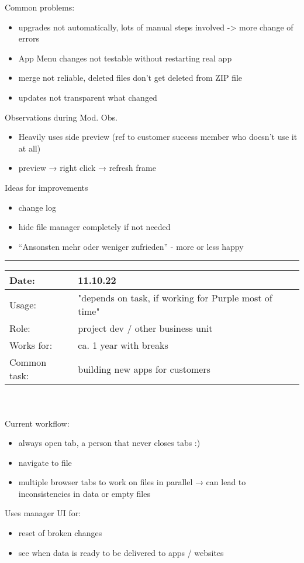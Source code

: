 Common problems:
\begin{itemize}[nosep]  
  \item upgrades not automatically, lots of manual steps involved -> more change of errors
  \item App Menu changes not testable without restarting real app
  \item merge not reliable, deleted files don't get deleted from ZIP file
  \item updates not transparent what changed
\end{itemize}


Observations during Mod. Obs.
\begin{itemize}[nosep]  
  \item Heavily uses side preview (ref to customer success member who doesn't use it at all)
  \item preview → right click → refresh frame
\end{itemize}

Ideas for improvements
\begin{itemize}[nosep]  
  \item change log
  \item hide file manager completely if not needed
  \item “Ansonsten mehr oder weniger zufrieden” - more or less happy
\end{itemize}
\bigskip
\hrule
\begin{tabularx}{\linewidth}{lX}
  Date: & 11.10.22 \\
  \hline
  Usage: & "depends on task, if working for Purple most of time"\\
  \hline
  Role: & project dev / other business unit \\
  \hline
  Works for: & ca. 1 year with breaks \\
  \hline
  Common task: &  building new apps for customers
\end{tabularx}
\\\\
Current workflow:
\begin{itemize}[nosep]
  \item always open tab, a person that never closes tabs :)
  \item navigate to file
  \item multiple browser tabs to work on files in parallel → can lead to inconsistencies in data or empty files
\end{itemize}
Uses manager UI for:
\begin{itemize}[nosep]
  \item reset of broken changes
  \item see when data is ready to be delivered to apps / websites
\end{itemize}

